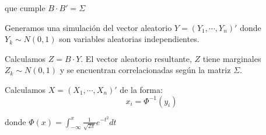 \noindent que cumple $B \cdot B' = \Sigma$

\noindent Generamos una simulaci\'on del vector aleatorio $Y=(Y_1, \cdots, Y_n)'$ 
donde $Y_k \sim N(0,1)$ son variables aleatorias independientes.

\noindent Calculamos $Z = B \cdot Y$. El vector aleatorio resultante, $Z$ tiene
marginales $Z_k \sim N(0,1)$ y se encuentran correlacionadas seg\'un la matriz 
$\Sigma$.

\noindent Calculamos $X = (X_1, \cdots, X_n)'$ de la forma:
\begin{displaymath}
x_i = \Phi^{-1}(y_i)
\end{displaymath}

\noindent donde $\Phi(x) = \int_{-\infty}^{x} \frac{1}{\sqrt{2 \pi}} e^{-t^2} dt$

